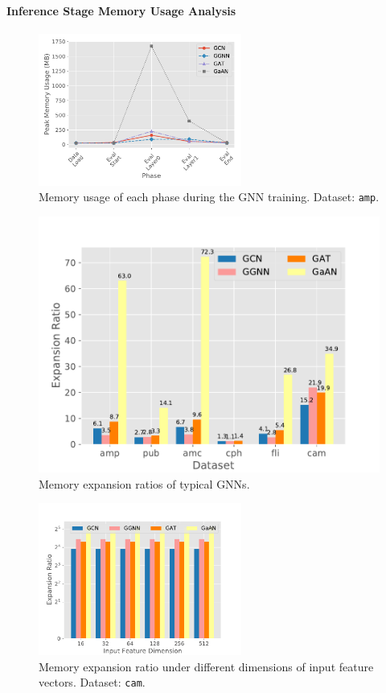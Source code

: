 \paragraph{Inference Stage Memory Usage Analysis}

\begin{figure}[H]
    \centering
    \includegraphics[height=5cm]{figs/experiments/exp_inference_full_memory_usage_stage_amp.pdf}
    \caption{Memory usage of each phase during the GNN training. Dataset: \texttt{amp}.}
    \label{fig:exp_inference_full_memory_usage_stage_amp}
\end{figure}

\begin{figure}[H]
    \centering
    \includegraphics[width=0.5\columnwidth]{figs/experiments/exp_inference_full_memory_expansion_ratio.pdf}
    \caption{Memory expansion ratios of typical GNNs.}
    \label{fig:exp_inference_full_memory_expansion_ratio}
\end{figure}

\begin{figure}[H]
    \centering
    \includegraphics[height=5cm]{figs/experiments/exp_inference_full_memory_expansion_ratio_input_feature_dimension_com-amazon_expansion_ratio.pdf}
    \caption{Memory expansion ratio under different dimensions of input feature vectors. Dataset: \texttt{cam}.}
    \label{fig:exp_inference_full_memory_expension_ratio_input_feature_dimension}
\end{figure}


